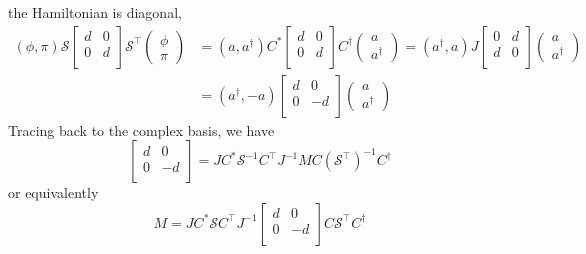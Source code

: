 the Hamiltonian is diagonal,
\begin{equation}
\begin{aligned}
( \phi , \pi ) \mathcal{S}
\begin{bmatrix}
d & 0 \\
0 & d \\ 
\end{bmatrix} \mathcal{S}^{\top} 
\begin{pmatrix}
\phi \\
\pi 
\end{pmatrix}
 &= ( a, a^{\dagger} ) C^*
\begin{bmatrix}
d & 0 \\
0 & d \\ 
\end{bmatrix}
C^{\dagger}
\begin{pmatrix}
a \\
a^{\dagger} 
\end{pmatrix} 
=( a^{\dagger}, a )J 
\begin{bmatrix}
0 & d \\
d & 0 \\ 
\end{bmatrix}
\begin{pmatrix}
a \\
a^{\dagger} 
\end{pmatrix}\\
&=( a^{\dagger}, -a )
\begin{bmatrix}
d & 0 \\
0 & -d \\ 
\end{bmatrix}
\begin{pmatrix}
a \\
a^{\dagger} 
\end{pmatrix}
\end{aligned}
\end{equation}
Tracing back to the complex basis, we have
\begin{equation}
\begin{bmatrix}
d & 0 \\
0 & -d \\ 
\end{bmatrix}
 = J C^* \mathcal{S}^{-1} C^{\top} J^{-1} M C (\mathcal{S}^{\top})^{-1} C^{\dagger} 
\end{equation}
or equivalently
\begin{equation}
\label{eq:M-diag}
M = J C^* \mathcal{S} C^{\top} J^{-1}
\begin{bmatrix}
d & 0 \\
0 & -d \\
\end{bmatrix} C \mathcal{S}^{\top} C^{\dagger}
\end{equation}
